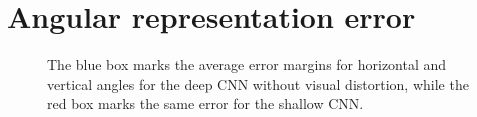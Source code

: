 \begin{figure}[H]
	\begin{center}
	\begin{scriptsize}
		\sffamily
		\def\svgwidth{0.95\textwidth}
		
	\end{scriptsize}
	\label{fig:failcollection2}
	\end{center}
\end{figure}

\section{Angular representation error}
\label{sec:angular-error}
\begin{figure}[H]
	\begin{center}
	\begin{scriptsize}
		\sffamily
		\def\svgwidth{1\textwidth}
		
	\end{scriptsize}
	\label{fig:angularerror}
	\caption[AR mean error visualised]{The blue box marks the average error margins for horizontal and vertical angles for the deep CNN without visual distortion, while the red box marks the same error for the shallow CNN.}
	\end{center}
\end{figure}
